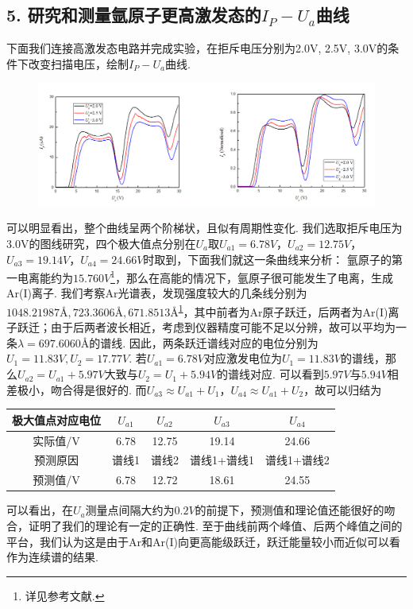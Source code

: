 \documentclass[UTF8]{ctexart}
\begin{document}
\subsection*{5. 研究和测量氩原子更高激发态的$I_P-U_a$曲线}
下面我们连接高激发态电路并完成实验，在拒斥电压分别为2.0V, 2.5V, 3.0V的条件下改变扫描电压，绘制$I_P-U_a$曲线.\vspace{-1em}
\begin{center}
    \begin{figure}[H]
        \includegraphics[scale=0.5]{4.png}\\\vspace{-3em}
    \end{figure}
\end{center}\vspace{-3em}
可以明显看出，整个曲线呈两个阶梯状，且似有周期性变化. 我们选取拒斥电压为3.0V的图线研究，四个极大值点分别在$U_a$取$U_{a1}=6.78V$，$U_{a2}=12.75V$，$U_{a3}=19.14V$，$U_{a4}=24.66V$时取到，下面我们就这一条曲线来分析：
氩原子的第一电离能约为$15.760V$\footnote{详见参考文献.\label{ft}}，那么在高能的情况下，氩原子很可能发生了电离，生成Ar(I)离子. 我们考察Ar光谱表，发现强度较大的几条线分别为$1048.21987Å, 723.3606Å, 671.8513Å$\textsuperscript{\ref {ft}}，其中前者为Ar原子跃迁，后两者为Ar(I)离子跃迁；由于后两者波长相近，考虑到仪器精度可能不足以分辨，故可以平均为一条$\lambda=697.6060Å$的谱线. 因此，两条跃迁谱线对应的电位分别为$U_1=11.83V, U_2=17.77V$. 若$U_{a1}=6.78V$对应激发电位为$U_1=11.83V$的谱线，那么$U_{a2}=U_{a1}+5.97V$大致与$U_2=U_1+5.94V$的谱线对应. 可以看到$5.97V$与$5.94V$相差极小，吻合得是很好的. 而$U_{a3}\approx U_{a1}+U_1$，$U_{a4}\approx U_{a1}+U_{2}$，故可以归结为
\begin{table}[H]
    \begin{center}
        \begin{tabular}{|c|c|c|c|c|}
            \hline
            极大值点对应电位&$U_{a1}$&$U_{a2}$&$U_{a3}$&$U_{a4}$\\
            \hline
            实际值/V&6.78&12.75&19.14&24.66\\
            \hline
            预测原因&谱线1&谱线2&谱线1+谱线1&谱线1+谱线2\\
            \hline
            预测值/V&6.78&12.72&18.61&24.55\\
            \hline
        \end{tabular}
    \end{center}
\end{table}\vspace{-2em}
可以看出，在$U_a$测量点间隔大约为$0.2V$的前提下，预测值和理论值还能很好的吻合，证明了我们的理论有一定的正确性. 至于曲线前两个峰值、后两个峰值之间的平台，我们认为这是由于Ar和Ar(I)向更高能级跃迁，跃迁能量较小而近似可以看作为连续谱的结果.
\end{document}
